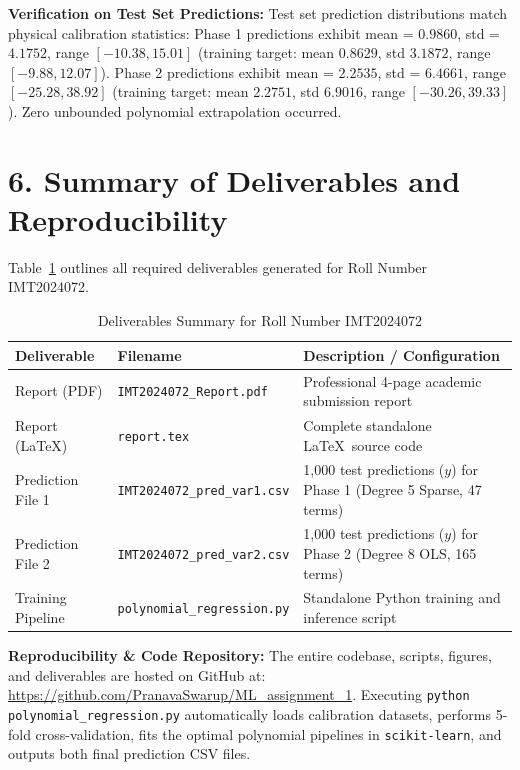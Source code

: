 \documentclass[11pt,a4paper]{article}
\begin{document}
\textbf{Verification on Test Set Predictions:} Test set prediction distributions match physical calibration statistics: Phase 1 predictions exhibit mean = $0.9860$, std = $4.1752$, range $[-10.38, 15.01]$ (training target: mean $0.8629$, std $3.1872$, range $[-9.88, 12.07]$). Phase 2 predictions exhibit mean = $2.2535$, std = $6.4661$, range $[-25.28, 38.92]$ (training target: mean $2.2751$, std $6.9016$, range $[-30.26, 39.33]$). Zero unbounded polynomial extrapolation occurred.

\section{\color{primary} 6. Summary of Deliverables and Reproducibility}

Table~\ref{tab:deliverables} outlines all required deliverables generated for Roll Number IMT2024072.

\begin{table}[h]
\centering
\small
\caption{Deliverables Summary for Roll Number IMT2024072}
\label{tab:deliverables}
\begin{tabular}{lll}
\toprule
\rowcolor{primary} \color{white}\textbf{Deliverable} & \color{white}\textbf{Filename} & \color{white}\textbf{Description / Configuration} \\
\midrule
Report (PDF) & \texttt{IMT2024072\_Report.pdf} & Professional 4-page academic submission report \\
\rowcolor{tablelight} Report (\LaTeX) & \texttt{report.tex} & Complete standalone \LaTeX\ source code \\
Prediction File 1 & \texttt{IMT2024072\_pred\_var1.csv} & 1,000 test predictions ($y$) for Phase 1 (Degree 5 Sparse, 47 terms) \\
\rowcolor{tablelight} Prediction File 2 & \texttt{IMT2024072\_pred\_var2.csv} & 1,000 test predictions ($y$) for Phase 2 (Degree 8 OLS, 165 terms) \\
Training Pipeline & \texttt{polynomial\_regression.py} & Standalone Python training and inference script \\
\bottomrule
\end{tabular}
\end{table}

\textbf{Reproducibility \& Code Repository:} The entire codebase, scripts, figures, and deliverables are hosted on GitHub at: \url{https://github.com/PranavaSwarup/ML_assignment_1}. Executing \texttt{python polynomial\_regression.py} automatically loads calibration datasets, performs 5-fold cross-validation, fits the optimal polynomial pipelines in \texttt{scikit-learn}, and outputs both final prediction CSV files.
\end{document}
